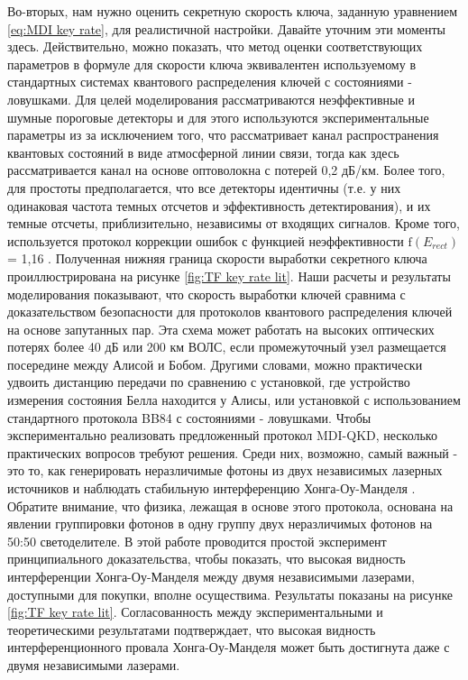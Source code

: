 Во-вторых, нам нужно оценить секретную скорость ключа, заданную уравнением \ref{eq:MDI key rate}, для реалистичной настройки. Давайте уточним эти моменты здесь. Действительно, можно показать, что метод оценки соответствующих параметров в формуле для скорости ключа эквивалентен используемому в стандартных системах квантового распределения ключей с состояниями - ловушками. Для целей моделирования рассматриваются неэффективные и шумные пороговые детекторы и  для этого используются экспериментальные параметры из \cite{takeoka2014} за исключением того, что \cite{takeoka2014} рассматривает канал распространения квантовых состояний в виде атмосферной линии связи, тогда как здесь рассматривается канал на основе оптоволокна с потерей 0,2 дБ/км. Более того, для простоты предполагается, что все детекторы идентичны (т.е. у них одинаковая частота темных отсчетов и эффективность детектирования), и их темные отсчеты, приблизительно, независимы от входящих сигналов. Кроме того, используется протокол коррекции ошибок с функцией неэффективности $\text{f}(E_{rect})$ = 1,16 \cite{pirandola2017}. Полученная нижняя граница скорости выработки секретного ключа проиллюстрирована на рисунке \ref{fig:TF key rate lit}. Наши расчеты и результаты моделирования показывают, что скорость выработки ключей сравнима с доказательством безопасности \cite{ma2007} для протоколов квантового распределения ключей на основе запутанных пар. Эта схема может работать на высоких оптических потерях более 40 дБ или 200 км ВОЛС, если промежуточный узел размещается посередине между Алисой и Бобом. Другими словами, можно практически удвоить дистанцию передачи по сравнению с установкой, где устройство измерения состояния Белла находится у Алисы, или установкой с использованием стандартного протокола BB84 с состояниями - ловушками.
Чтобы экспериментально реализовать предложенный протокол MDI-QKD, несколько практических вопросов требуют решения. Среди них, возможно, самый важный - это то, как генерировать неразличимые фотоны из двух независимых лазерных источников и наблюдать стабильную интерференцию Хонга-Оу-Манделя \cite{hong1987}. Обратите внимание, что физика, лежащая в основе этого протокола, основана на явлении группировки фотонов в одну группу двух неразличимых фотонов на 50:50 светоделителе. В этой работе проводится простой эксперимент принципиального доказательства, чтобы показать, что высокая видность интерференции Хонга-Оу-Манделя между двумя независимыми лазерами, доступными для покупки, вполне осуществима. Результаты показаны на рисунке \ref{fig:TF key rate lit}. Согласованность между экспериментальными и теоретическими результатами подтверждает, что высокая видность интерференционного провала Хонга-Оу-Манделя может быть достигнута даже с двумя независимыми лазерами.
